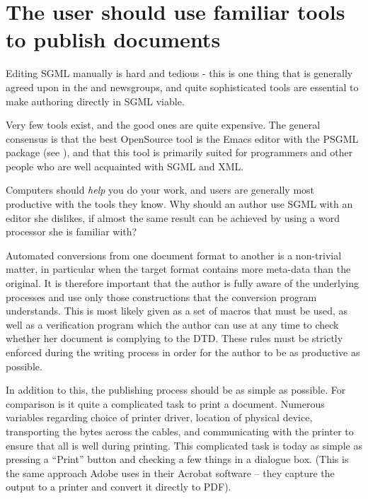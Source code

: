\section{The user should use familiar tools to publish documents}
\label{sec:the-user-should-use-familiar-tools-to-publish-documents}

Editing SGML manually is hard and tedious - this is one
thing that is generally agreed upon in the
 and
newsgroups, and quite sophisticated tools are essential to
make authoring directly in SGML viable.

Very few tools exist, and the good ones are quite expensive.  The
general consensus is that the best OpenSource tool is the Emacs editor
with the PSGML package (see ), and that
this tool is primarily suited for programmers and other people who are
well acquainted with SGML and XML.

Computers should \textit{help} you do your work, and users are
generally most productive with the tools they know.  Why should an
author use SGML with an editor she dislikes, if almost the same result
can be achieved by using a word processor she is familiar with?

Automated conversions from one document format to another is a
non-trivial matter, in particular when the target format contains more
meta-data than the original.  It is therefore important that the
author is fully aware of the underlying processes and use only those
constructions that the conversion program understands.  This is most
likely given as a set of macros that must be used, as well as a
verification program which the author can use at any time to check
whether her document is complying to the DTD.  These rules must be
strictly enforced during the writing process in order for the author
to be as productive as possible.

In addition to this, the publishing process should be as simple as
possible.  For comparison is it quite a complicated task to print a
document.  Numerous variables regarding choice of printer driver,
location of physical device, transporting the bytes across the cables,
and communicating with the printer to ensure that all is well during
printing.  This complicated task is today as simple as pressing a
``Print'' button and checking a few things in a dialogue box. (This is
the same approach Adobe uses in their Acrobat software -- they capture
the output to a printer and convert it directly to PDF).

